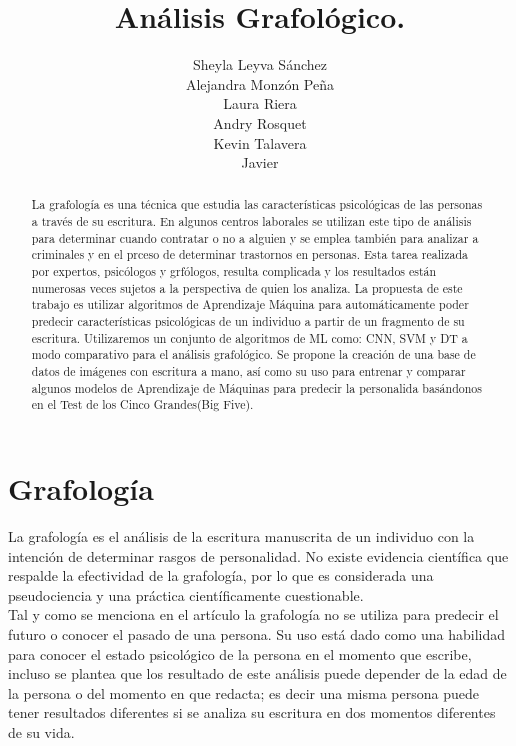 \documentclass[10pt, a4paper]{article}
\begin{document}
\title{An\'alisis Grafol\'ogico.}
\author{Sheyla Leyva S\'anchez \\ Alejandra Monz\'on Pe\~na \\ Laura Riera \\ Andry Rosquet \\ Kevin Talavera \\ Javier}
\date{}
\maketitle

    \begin{abstract}
        La grafología es una técnica que estudia las características psicológicas de las personas a través de su escritura. 
        En algunos centros laborales se utilizan este tipo de análisis para determinar cuando contratar o no a alguien y se emplea también 
        para analizar a criminales y en el prceso de determinar trastornos en personas. Esta tarea realizada por expertos,
        psicólogos y grfólogos, resulta complicada y los resultados están numerosas veces sujetos a la perspectiva de quien los analiza. La propuesta de este trabajo es 
        utilizar algoritmos de Aprendizaje Máquina para automáticamente poder predecir características psicológicas de un individuo a partir de un fragmento de su escritura. 
        Utilizaremos un conjunto de algoritmos de ML como: CNN, SVM y DT a modo comparativo para el análisis grafológico. 
        Se propone la creaci\'on de una base de datos de im\'agenes con escritura a mano, as\'i como su uso para entrenar y comparar algunos modelos de Aprendizaje de M\'aquinas para predecir la personalida bas\'andonos en el Test de los Cinco Grandes(Big Five).
    \end{abstract}
    
    \section{Grafolog\'ia}
    
    La grafología es el análisis de la escritura manuscrita de un individuo con la intención de determinar rasgos de personalidad. 
    No existe evidencia científica que respalde la efectividad de la grafología, por lo que es considerada una pseudociencia 
    y una práctica científicamente cuestionable.\\ 

    Tal y como se menciona en el art\'iculo \cite{19} la grafolog\'ia no se utiliza para predecir el futuro o conocer el pasado de una persona. Su uso 
    est\'a dado como una habilidad para conocer el estado psicol\'ogico de la persona en el momento que escribe, incluso se plantea que los resultado de este an\'alisis 
    puede depender de la edad de la persona o del momento en que redacta; es decir una misma persona puede tener resultados diferentes si se analiza su escritura en dos momentos 
    diferentes de su vida.\\
    
\end{document}
